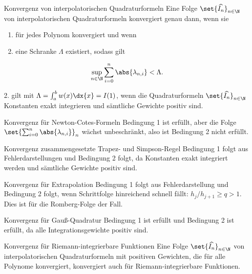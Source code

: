 \begin{karte}{Konvergenz von interpolatorischen Quadraturformeln}
    Eine Folge \( \set{\widehat{I_n}}_{n\in\N} \) von interpolatorischen Quadraturformeln 
    konvergiert genau dann, wenn sie 
    \begin{enumerate}
        \item für jedes Polynom konvergiert und wenn
        \item eine Schranke \(\Lambda\) existiert, sodass gilt 
    \end{enumerate}
    \[ \sup_{n\in\N} \sum_{i=0}^n \abs{\lambda_{n,i}} < \Lambda. \]

    2. gilt mit \( \Lambda = \int_a^b w(x) \dx{x} = I(1) \), wenn die Quadraturformeln \( \set{\widehat{I_n}}_{n\in\N} \) 
    Konstanten exakt integrieren und sämtliche Gewichte positiv sind.
\end{karte}

\begin{karte}{Konvergenz für Newton-Cotes-Formeln}
    Bedingung 1 ist erfüllt, aber die Folge \( \set{ \sum_{i=0}^n \abs{\lambda_{n,i}} }_n \) 
    wächst unbeschränkt, also ist Bedingung 2 nicht erfüllt.
\end{karte}

\begin{karte}{Konvergenz zusammengesetzte Trapez- und Simpson-Regel}
    Bedingung 1 folgt aus Fehlerdarstellungen und Bedingung 2 folgt, da Konstanten exakt 
    integriert werden und sämtliche Gewichte positiv sind.
\end{karte}

\begin{karte}{Konvergenz für Extrapolation}
    Bedingung 1 folgt aus Fehlerdarstellung und Bedingung 2 folgt, wenn Schrittfolge hinreichend schnell 
    fällt: \( h_j/h_{j+1} \geq q > 1 \). Dies ist für die Romberg-Folge der Fall.
\end{karte}

\begin{karte}{Konvergenz für Gauß-Quadratur}
    Bedingung 1 ist erfüllt und Bedingung 2 ist erfüllt, da alle Integrationsgewichte positiv sind.
\end{karte}

\begin{karte}{Konvergenz für Riemann-integrierbare Funktionen}
    Eine Folge \( \set{\widehat{I_n}}_{n\in\N} \) von interpolatorischen Quadraturformeln mit positiven 
    Gewichten, die für alle Polynome konvergiert, konvergiert auch für Riemann-integrierbare Funktionen.
\end{karte}